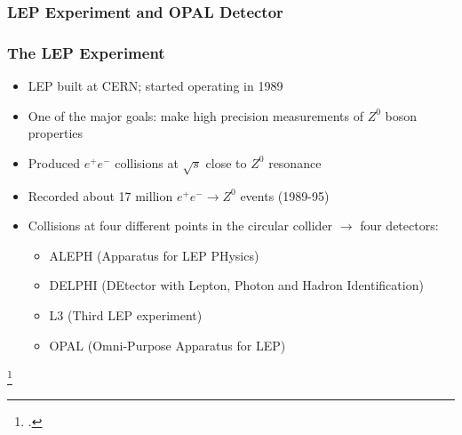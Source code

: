 \documentclass[10pt]{beamer}
\begin{document}
\subsubsection{LEP Experiment and OPAL Detector}
\begin{frame}
\frametitle{The LEP Experiment}
\begin{itemize}
\item LEP built at CERN; started operating in 1989
\item One of the major goals: make high precision measurements of $Z^{0}$ boson properties
\item Produced $e^{+}e^{-}$ collisions at $\sqrt{s}$ close to $Z^{0}$ resonance 
\item Recorded about 17 million $e^{+}e^{-}\rightarrow Z^{0}$ events (1989-95) \footnotemark{}
\item Collisions at four different points in the circular collider $\rightarrow$ four detectors:
\begin{itemize}
\item ALEPH (Apparatus for LEP PHysics)
\item DELPHI (DEtector with Lepton, Photon and Hadron Identification)
\item L3 (Third LEP experiment)
\item OPAL (Omni-Purpose Apparatus for LEP)
\end{itemize}
\end{itemize}
\footcitetext{thomson_2013}
\end{frame}
\end{document}
